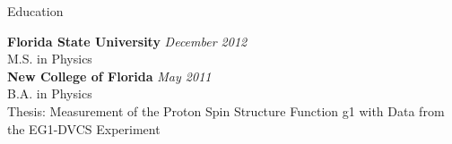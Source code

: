 \documentclass{resume} %
\begin{document}

\begin{rSection}{Education}

{\bf Florida State University} \hfill {\em December 2012} \\ 
M.S. in Physics \\


{\bf New College of Florida} \hfill {\em May 2011} \\ 
B.A. in Physics \\
Thesis: Measurement of the Proton Spin Structure Function g1 with Data from the EG1-DVCS Experiment


\end{rSection}

\end{document}
